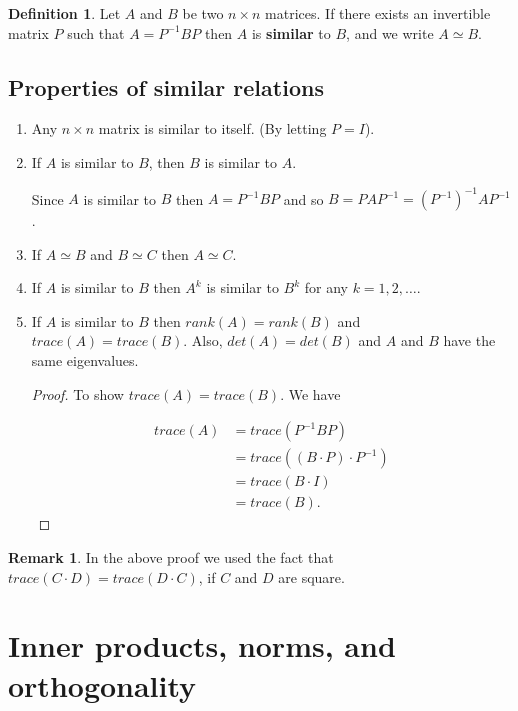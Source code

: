 \documentclass[12pt]{article}
\theoremstyle{definition}
\newtheorem*{definition}{Definition}
\newtheorem*{remark}{Remark}
\begin{document}
\begin{definition}
Let $A$ and $B$ be two $n \times n$ matrices. If there exists an invertible matrix $P$ such
that $A = P^{-1} B P$ then $A$ is \textbf{similar} to $B$, and we write $A \simeq B$.
\end{definition}


\subsection{Properties of similar relations}

\begin{enumerate}[label =  (\arabic*)]
\item Any $n \times n$ matrix is similar to itself. (By letting $P = I$).
\item If $A$ is similar to $B$, then $B$ is similar to $A$.

Since $A$ is similar to $B$ then $A = P^{-1} B P$ and so $ B= PAP^{-1} = (P^{-1})^{-1} A P^{-1}$.

\item If $A \simeq B$ and $B \simeq C$ then $A \simeq C$.

\item If $A$ is similar to $B$ then $A^k$ is similar to $B^k$ for any $k = 1, 2, \ldots$.
\item If $A$ is similar to $B$ then $rank(A) = rank(B)$ and $trace(A) = trace(B)$.
Also, $det(A) = det(B)$ and $A$ and $B$ have the same eigenvalues.

\begin{proof}
To show $trace(A) = trace(B)$. We have

\begin{align*}
trace(A) &= trace(P^{-1} B P) \\
&= trace((B \cdot P) \cdot P^{-1}) \\
&= trace(B \cdot I) \\
&= trace(B).
\end{align*}
\end{proof}
\end{enumerate}

\begin{remark}
In the above proof we used the fact that $trace(C \cdot D) = trace(D \cdot C)$, if $C$ and
$D$ are square.
\end{remark}


\section{Inner products, norms, and orthogonality}
\end{document}
